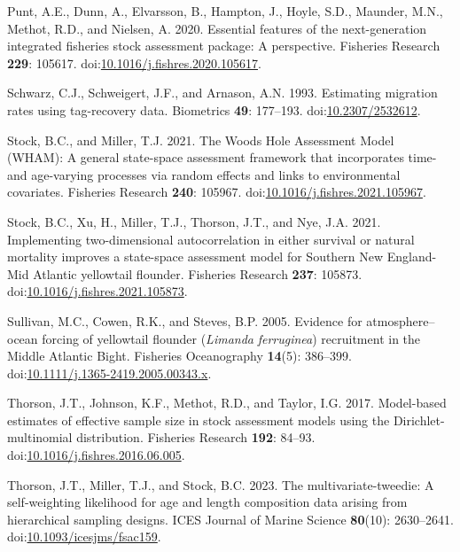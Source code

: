 \documentclass[
]{article}
\newlength{\cslhangindent}
\newlength{\cslentryspacingunit} %
\newenvironment{CSLReferences}[2] %
 {%
  \setlength{\parindent}{0pt}
  \ifodd #1
  \let\oldpar\par
  \def\par{\hangindent=\cslhangindent\oldpar}
  \fi
  \setlength{\parskip}{#2\cslentryspacingunit}
 }%
 {}
\begin{document}
\begin{CSLReferences}{1}{0}
\leavevmode{}%
Punt, A.E., Dunn, A., Elvarsson, B., Hampton, J., Hoyle, S.D., Maunder,
M.N., Methot, R.D., and Nielsen, A. 2020. Essential features of the
next-generation integrated fisheries stock assessment package: A
perspective. Fisheries Research \textbf{229}: 105617.
doi:\href{https://doi.org/10.1016/j.fishres.2020.105617}{10.1016/j.fishres.2020.105617}.

\leavevmode{}%
Schwarz, C.J., Schweigert, J.F., and Arnason, A.N. 1993. Estimating
migration rates using tag-recovery data. Biometrics \textbf{49}:
177--193. doi:\href{https://doi.org/10.2307/2532612}{10.2307/2532612}.

\leavevmode{}%
Stock, B.C., and Miller, T.J. 2021. The {Woods Hole Assessment Model}
({WHAM}): A general state-space assessment framework that incorporates
time- and age-varying processes via random effects and links to
environmental covariates. Fisheries Research \textbf{240}: 105967.
doi:\href{https://doi.org/10.1016/j.fishres.2021.105967}{10.1016/j.fishres.2021.105967}.

\leavevmode{}%
Stock, B.C., Xu, H., Miller, T.J., Thorson, J.T., and Nye, J.A. 2021.
Implementing two-dimensional autocorrelation in either survival or
natural mortality improves a state-space assessment model for {Southern
New England}-{Mid Atlantic} yellowtail flounder. Fisheries Research
\textbf{237}: 105873.
doi:\href{https://doi.org/10.1016/j.fishres.2021.105873}{10.1016/j.fishres.2021.105873}.

\leavevmode{}%
Sullivan, M.C., Cowen, R.K., and Steves, B.P. 2005. Evidence for
atmosphere{--}ocean forcing of yellowtail flounder (\emph{{L}imanda}
\emph{ferruginea}) recruitment in the {M}iddle {A}tlantic {B}ight.
Fisheries Oceanography \textbf{14}(5): 386--399.
doi:\href{https://doi.org/10.1111/j.1365-2419.2005.00343.x}{10.1111/j.1365-2419.2005.00343.x}.

\leavevmode{}%
Thorson, J.T., Johnson, K.F., Methot, R.D., and Taylor, I.G. 2017.
Model-based estimates of effective sample size in stock assessment
models using the {D}irichlet-multinomial distribution. Fisheries
Research \textbf{192}: 84--93.
doi:\href{https://doi.org/10.1016/j.fishres.2016.06.005}{10.1016/j.fishres.2016.06.005}.

\leavevmode{}%
Thorson, J.T., Miller, T.J., and Stock, B.C. 2023. The
multivariate-tweedie: A self-weighting likelihood for age and length
composition data arising from hierarchical sampling designs. ICES
Journal of Marine Science \textbf{80}(10): 2630--2641.
doi:\href{https://doi.org/10.1093/icesjms/fsac159}{10.1093/icesjms/fsac159}.


\end{CSLReferences}
\end{document}
